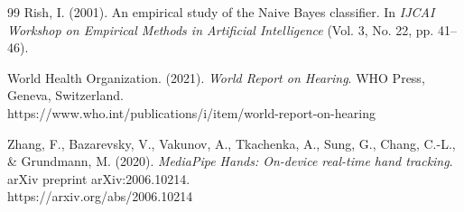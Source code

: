\begin{thebibliography}{99}
Rish, I. (2001). An empirical study of the Naive Bayes classifier. In \textit{IJCAI Workshop on Empirical Methods in Artificial Intelligence} (Vol. 3, No. 22, pp. 41--46).

World Health Organization. (2021). \textit{World Report on Hearing}. WHO Press, Geneva, Switzerland. \\
https://www.who.int/publications/i/item/world-report-on-hearing

Zhang, F., Bazarevsky, V., Vakunov, A., Tkachenka, A., Sung, G., Chang, C.-L., \& Grundmann, M. (2020). \textit{MediaPipe Hands: On-device real-time hand tracking}. arXiv preprint arXiv:2006.10214. \\
https://arxiv.org/abs/2006.10214

\end{thebibliography}